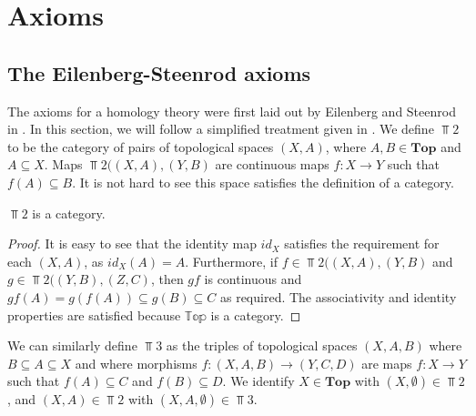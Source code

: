 \section{Axioms}\label{sec-axioms}
\subsection{The Eilenberg-Steenrod axioms}
The axioms for a homology theory were first laid out by Eilenberg and Steenrod in \cite{Eilenberg}. In this section, we will follow a simplified treatment given in \cite{Werndli}. We define $\Top{2}$ to be the category of pairs of topological spaces $(X,A)$, where $A,B\in \mathbf{Top}$ and $A\subseteq X$. Maps $\Top{2}((X,A),(Y,B)$ are continuous maps $f:X\rightarrow Y$ such that $f(A)\subseteq B$. It is not hard to see this space satisfies the definition of a category.

\begin{lemma}
$\Top{2}$ is a category.
\end{lemma}
\begin{proof}
It is easy to see that the identity map $id_X$ satisfies the requirement for each $(X,A)$, as $id_X(A)=A$. Furthermore, if $f\in \Top{2}((X,A),(Y,B)$ and $g\in \Top{2}((Y,B),(Z,C)$, then $gf$ is continuous and $gf(A)= g(f(A))\subseteq g(B)\subseteq C$ as required. The associativity and identity properties are satisfied because $\mathbb{Top}$ is a category.
\end{proof}

We can similarly define $\Top{3}$ as the triples of topological spaces $(X,A,B)$ where $B\subseteq A \subseteq X$ and where morphisms $f:(X,A,B)\rightarrow (Y,C,D)$ are maps $f:X\rightarrow Y$ such that $f(A)\subseteq C$ and $f(B)\subseteq D$. We identify $X\in \mathbf{Top}$ with $(X,\emptyset)\in \Top{2}$, and $(X,A)\in \Top{2}$ with $(X,A,\emptyset)\in \Top{3}$.

